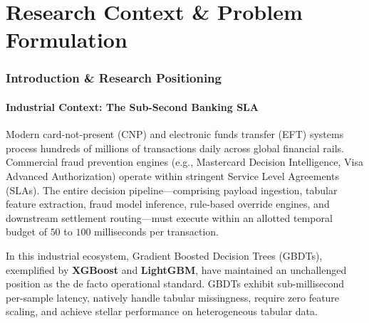 \documentclass[11pt,a4paper]{report}
\begin{document}
\newpage
\tableofcontents
\newpage
\listoftables
\newpage
\listoffigures
\newpage

\part{Research Context \& Problem Formulation}

\section{Introduction \& Research Positioning}

\subsection{Industrial Context: The Sub-Second Banking SLA}
Modern card-not-present (CNP) and electronic funds transfer (EFT) systems process hundreds of millions of transactions daily across global financial rails. Commercial fraud prevention engines (e.g., Mastercard Decision Intelligence, Visa Advanced Authorization) operate within stringent Service Level Agreements (SLAs). The entire decision pipeline---comprising payload ingestion, tabular feature extraction, fraud model inference, rule-based override engines, and downstream settlement routing---must execute within an allotted temporal budget of $50$ to $100$ milliseconds per transaction. 

In this industrial ecosystem, Gradient Boosted Decision Trees (GBDTs), exemplified by \textbf{XGBoost} \cite{chen2016xgboost} and \textbf{LightGBM}, have maintained an unchallenged position as the de facto operational standard. GBDTs exhibit sub-millisecond per-sample latency, natively handle tabular missingness, require zero feature scaling, and achieve stellar performance on heterogeneous tabular data.
\end{document}
